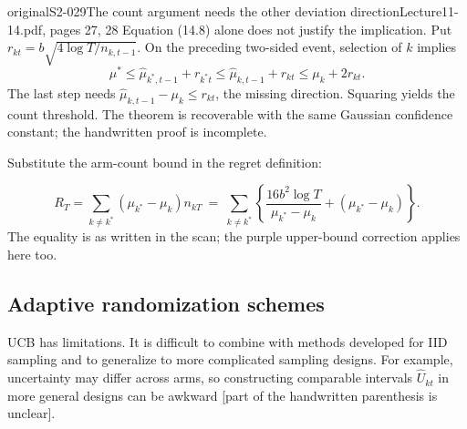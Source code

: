 \begin{reviewnote}{original}{S2-029}{The count argument needs the other deviation direction}{Lecture11-14.pdf, pages 27, 28}
Equation (14.8) alone does not justify the implication. Put $r_{kt}=b\sqrt{4\log T/n_{k,t-1}}$. On the preceding two-sided event, selection of $k$ implies
\[
 \mu^*\le\widehat\mu_{k^*,t-1}+r_{k^*t}
 \le\widehat\mu_{k,t-1}+r_{kt}\le\mu_k+2r_{kt}.
\]
The last step needs $\widehat\mu_{k,t-1}-\mu_k\le r_{kt}$, the missing direction. Squaring yields the count threshold. The theorem is recoverable with the same Gaussian confidence constant; the handwritten proof is incomplete.
\end{reviewnote}



Substitute the arm-count bound in the regret definition:
\begin{center}
\end{center}
\[
 R_T=\sum_{k\ne k^*}(\mu_{k^*}-\mu_k)n_{kT}
 \ =\ \sum_{k\ne k^*}\left\{
 \frac{16b^2\log T}{\mu_{k^*}-\mu_k}+(\mu_{k^*}-\mu_k)\right\}.
\]
 The equality is as written in the scan; the purple upper-bound correction applies here too.

\subsection{Adaptive randomization schemes}
UCB has limitations. It is difficult to combine with methods developed for IID sampling and to generalize to more complicated sampling designs. For example, uncertainty may differ across arms, so constructing comparable intervals $\widehat U_{kt}$ in more general designs can be awkward [part of the handwritten parenthesis is unclear]. 

